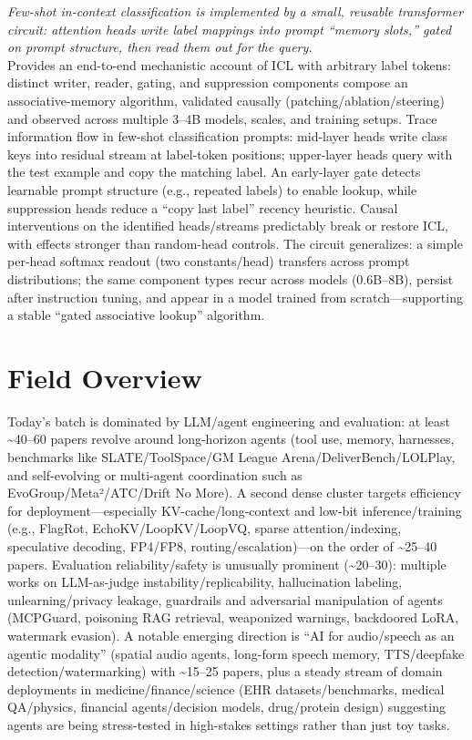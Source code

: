 \documentclass[12pt,letterpaper]{article}
\begin{document}
{\small\textit{Few-shot in-context classification is implemented by a small, reusable transformer circuit: attention heads write label mappings into prompt ``memory slots,'' gated on prompt structure, then read them out for the query.}}\\[1pt]
{\footnotesize Provides an end-to-end mechanistic account of ICL with arbitrary label tokens: distinct writer, reader, gating, and suppression components compose an associative-memory algorithm, validated causally (patching/ablation/steering) and observed across multiple 3--4B models, scales, and training setups. Trace information flow in few-shot classification prompts: mid-layer heads write class keys into residual stream at label-token positions; upper-layer heads query with the test example and copy the matching label. An early-layer gate detects learnable prompt structure (e.g., repeated labels) to enable lookup, while suppression heads reduce a ``copy last label'' recency heuristic. Causal interventions on the identified heads/streams predictably break or restore ICL, with effects stronger than random-head controls. The circuit generalizes: a simple per-head softmax readout (two constants/head) transfers across prompt distributions; the same component types recur across models (0.6B--8B), persist after instruction tuning, and appear in a model trained from scratch---supporting a stable ``gated associative lookup'' algorithm.}

\medskip



\section*{Field Overview}
{\footnotesize Today's batch is dominated by LLM/agent engineering and evaluation: at least \textasciitilde{}40--60 papers revolve around long-horizon agents (tool use, memory, harnesses, benchmarks like SLATE/ToolSpace/GM League Arena/DeliverBench/LOLPlay, and self-evolving or multi-agent coordination such as EvoGroup/Meta²/ATC/Drift No More). A second dense cluster targets efficiency for deployment---especially KV-cache/long-context and low-bit inference/training (e.g., FlagRot, EchoKV/LoopKV/LoopVQ, sparse attention/indexing, speculative decoding, FP4/FP8, routing/escalation)---on the order of \textasciitilde{}25--40 papers. Evaluation reliability/safety is unusually prominent (\textasciitilde{}20--30): multiple works on LLM-as-judge instability/replicability, hallucination labeling, unlearning/privacy leakage, guardrails and adversarial manipulation of agents (MCPGuard, poisoning RAG retrieval, weaponized warnings, backdoored LoRA, watermark evasion). A notable emerging direction is ``AI for audio/speech as an agentic modality'' (spatial audio agents, long-form speech memory, TTS/deepfake detection/watermarking) with \textasciitilde{}15--25 papers, plus a steady stream of domain deployments in medicine/finance/science (EHR datasets/benchmarks, medical QA/physics, financial agents/decision models, drug/protein design) suggesting agents are being stress-tested in high-stakes settings rather than just toy tasks.}
\end{document}
